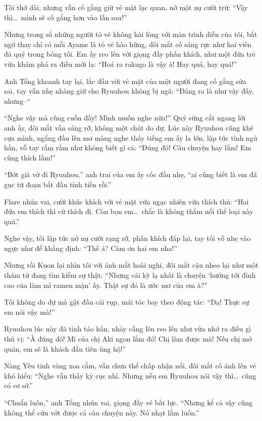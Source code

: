 \documentclass[../main.tex]{subfiles}
\begin{document}
Tôi thở dài, nhưng vẫn cố gắng giữ vẻ mặt lạc quan, nở một nụ cười trừ: ``Vậy thì\dots\ mình sẽ cố gắng hơn vào lần sau!''

Nhưng trong số những người tỏ vẻ không hài lòng với màn trình diễn của tôi, bất ngờ thay chỉ có mỗi Ayame là tỏ vẻ hào hứng, đôi mắt cô sáng rực như hai viên đá quý trong bóng tối. Em ấy reo lên với giọng đầy phấn khích, như một đứa trẻ vừa khám phá ra điều mới lạ: ``Hoá ra rakugo là vậy à! Hay quá, hay quá!''

Anh Tổng khoanh tay lại, lắc đầu với vẻ mặt của một người đang cố gắng sửa sai, tay vẫn nhẹ nhàng giữ cho Ryuuhou không bị ngã: ``Đáng ra là như vậy đấy, nhưng--``

``Nghe vậy mà cũng cuốn đấy! Mình muốn nghe nữa!'' Quỷ sừng cắt ngang lời anh ấy, đôi mắt vẫn sáng rỡ, không một chút do dự. Lúc này Ryuuhou cũng khẽ cựa mình, ngẩng đầu lên mơ màng nghe thấy tiếng em ấy la lớn, lập tức tỉnh ngủ hẳn, vỗ tay rầm rầm như không biết gì cả: ``Đúng đó! Câu chuyện hay lắm! Em cũng thích lắm!''

``Bớt giả vờ đi Ryuuhou,'' anh trai của em ấy cốc đầu nhẹ, ``ai cũng biết là em đã gục từ đoạn bắt đầu tính tiền rồi.''

Flare nhún vai, cười khúc khích với vẻ mặt vừa ngạc nhiên vừa thích thú: ``Hai đứa em thích thì cứ thích đi. Còn bọn em\dots\ chắc là không thấm nổi thể loại này quá.''

Nghe vậy, tôi lập tức nở nụ cười rạng rỡ, phấn khích đáp lại, tay tôi vỗ nhẹ vào ngực như để khẳng định: ``Thế á? Cảm ơn hai em nha!''

Nhưng rồi Kuon lại nhìn tôi với ánh mắt hoài nghi, đôi mắt cậu nheo lại như một thám tử đang tìm kiếm sự thật: ``Nhưng cái kỳ lạ nhất là chuyện `hướng tới đỉnh cao của làm mì ramen mặn' ấy. Thật sự đó là ước mơ của em à?''

Tôi không do dự mà gật đầu cái rụp, mái tóc bay theo động tác: ``Dạ! Thực sự em nói vậy mà!''

Ryuuhou lúc này đã tỉnh táo hẳn, nhảy cẫng lên reo lên như vừa nhớ ra điều gì thú vị: ``À đúng đó! Mì của chị Aki ngon lắm đó! Chị làm được mà! Nếu chị mở quán, em sẽ là khách đầu tiên ủng hộ!''

Nàng Yêu tinh vàng xoa cằm, vẫn chưa thể chấp nhận nổi, đôi mắt cô ánh lên vẻ khó hiểu: ``Nghe vẫn thấy kỳ cục nhỉ. Nhưng nếu em Ryuuhou nói vậy thì\dots\ cũng có cơ sở.''

``Chuẩn luôn,'' anh Tổng nhún vai, giọng đầy vẻ bất lực. ``Nhưng kể cả vậy cũng không thể cứu vớt được cả câu chuyện này. Nó nhạt lắm luôn.''
\end{document}
